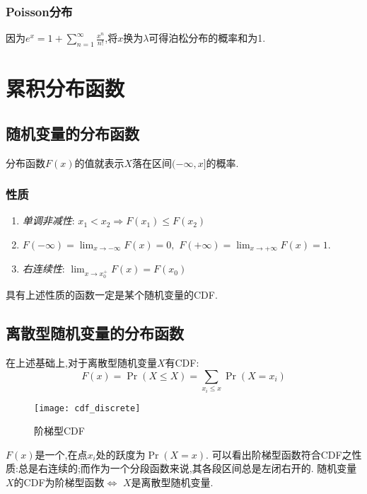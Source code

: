 \subsubsection{Poisson分布}
因为$e^x=1+\sum_{n=1}^{\infty}\frac{x^n}{n!}$,将$x$换为$\lambda$可得泊松分布的概率和为1.
\section{累积分布函数}
\subsection{随机变量的分布函数}
分布函数$F(x)$的值就表示$X$落在区间$(-\infty,x]$的概率.
\subsubsection{性质}
\begin{enumerate}
    \item \textit{单调非减性}: $x_1<x_2\Rightarrow F(x_1)\leq F(x_2)$
    \item $F(-\infty) = \lim_{x\rightarrow -\infty}F(x) = 0,\,\,F(+\infty) = \lim_{x\rightarrow +\infty}F(x) = 1$.
    \item \textit{右连续性}: $\lim_{x\rightarrow x_0^+}F(x) = F(x_0)$
\end{enumerate}
具有上述性质的函数一定是某个随机变量的CDF.
\clearpage
\subsection{离散型随机变量的分布函数}
在上述基础上,对于离散型随机变量$X$有CDF:
\[F(x) = \Pr(X\leq X) = \sum_{x_i\leq x}\Pr(X=x_i)\]

\begin{figure}[h]
    \centering
    \texttt{[image: cdf\_discrete]}
    \caption{阶梯型CDF}
\end{figure}
$F(x)$是一个,在点$x_i$处的跃度为$\Pr(X=x)$.
可以看出阶梯型函数符合CDF之性质:总是右连续的;而作为一个分段函数来说,其各段区间总是左闭右开的.
随机变量$X$的CDF为阶梯型函数$\Leftrightarrow$ $X$是离散型随机变量.
